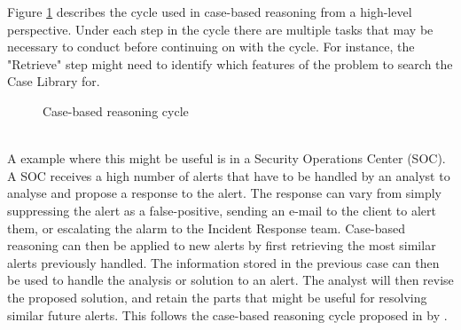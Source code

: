 Figure \ref{fig:case-based-reasoning-cycle} describes the cycle used in case-based reasoning from a high-level perspective.
Under each step in the cycle there are multiple tasks that may be necessary to conduct before continuing on with the cycle. For instance, the "Retrieve" step might need to identify which features of the problem to search the Case Library for.
\begin{figure}[ht]
\centering
\caption{Case-based reasoning cycle}
\label{fig:case-based-reasoning-cycle}
\end{figure}\\
A example where this might be useful is in a Security Operations Center (SOC). A SOC receives a high number of alerts that have to be handled by an analyst to analyse and propose a response to the alert. The response can vary from simply suppressing the alert as a false-positive, sending an e-mail to the client to alert them, or escalating the alarm to the Incident Response team. Case-based reasoning can then be applied to new alerts by first retrieving the most similar alerts previously handled. The information stored in the previous case can then be used to handle the analysis or solution to an alert. The analyst will then revise the proposed solution, and retain the parts that might be useful for resolving similar future alerts. This follows the case-based reasoning cycle proposed in  by \textcite{aamodt_1994}.


